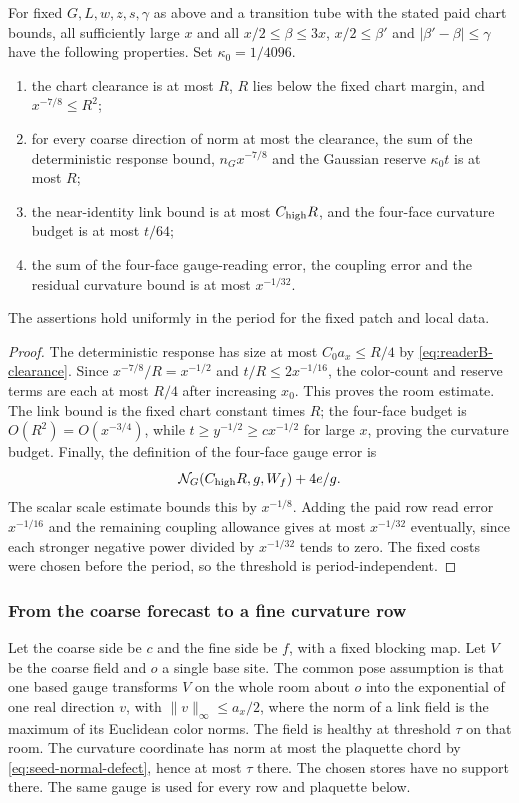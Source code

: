 \begin{lemma}
\label{lem:readerB-enlightened}
For fixed $G,L,w,z,s,\gamma$ as above and a transition tube with the stated
paid chart bounds, all sufficiently large $x$ and all
$x/2\leq\beta\leq3x$, $x/2\le\beta'$ and
$|\beta'-\beta|\le\gamma$ have the following properties. Set $\kappa_0=1/4096$.
\begin{enumerate}
\item the chart clearance is at most $R$, $R$ lies below the fixed chart
   margin, and $x^{-7/8}\leq R^2$;
\item for every coarse direction of norm at most the clearance, the sum of
   the deterministic response bound, $n_Gx^{-7/8}$ and the Gaussian
   reserve $\kappa_0t$ is at most $R$;
\item the near-identity link bound is at most $C_{\rm high}R$, and the four-face
   curvature budget is at most $t/64$;
\item the sum of the four-face gauge-reading error, the coupling error and
   the residual curvature bound is at most $x^{-1/32}$.
\end{enumerate}
The assertions hold uniformly in the period for the fixed patch and local
data.
\end{lemma}
\begin{proof}
The deterministic response has size at most $C_0a_x\le R/4$ by
\eqref{eq:readerB-clearance}.
Since
$x^{-7/8}/R=x^{-1/2}$ and
$t/R\leq2x^{-1/16}$, the color-count and reserve terms are each at most
$R/4$ after increasing $x_0$. This proves the room estimate. The link bound
is the fixed chart constant times $R$; the four-face budget is
$O(R^2)=O(x^{-3/4})$, while $t\geq y^{-1/2}\geq c x^{-1/2}$ for large
$x$, proving the curvature budget. Finally, the definition of the
four-face gauge error is
\[
 \mathcal N_G(C_{\rm high}R,g,W_f)+4e/g.
\]
The scalar scale estimate bounds this by $x^{-1/8}$. Adding the paid row
read error $x^{-1/16}$ and the remaining coupling allowance gives at most
$x^{-1/32}$ eventually, since each stronger negative power divided by
$x^{-1/32}$ tends to zero. The fixed costs were chosen before the period,
so the threshold is period-independent.
\end{proof}

\subsubsection{From the coarse forecast to a fine curvature row}

Let the coarse side be $c$ and the fine side be $f$, with a fixed blocking
map. Let $V$ be the coarse field and $o$ a single base site. The common pose
assumption is that one based gauge transforms $V$ on the whole room about
$o$ into the exponential of one real direction $v$, with
$\|v\|_\infty\le a_x/2$, where the norm of a link field is the
maximum of its Euclidean color norms. The field is healthy at
threshold $\tau$ on that room. The curvature coordinate has norm at most the plaquette chord by
\eqref{eq:seed-normal-defect}, hence at most $\tau$ there. The chosen stores have no support there. The same gauge is used
for every row and plaquette below.

